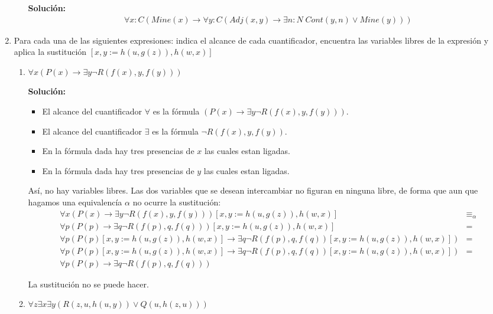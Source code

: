 \documentclass[8pt, letterpaper]{article}
\begin{document}
\begin{enumerate}
\begin{enumerate}
  \hfill\break
  \ttfamily
  {\bf Solución:}
  \begin{align*}
    \forall x:C(Mine(x) \rightarrow \forall y:C(Adj(x,y)\rightarrow \exists n:N\;Cont(y, n)\lor Mine(y)))
  \end{align*}
  \rmfamily
\end{enumerate}
\newpage
\item Para cada una de las siguientes expresiones: indica el alcance de cada cuantificador, encuentra las variables libres de la expresión y aplica la sustitución $[x,y:=h(u,g(z)),h(w,x)]$
\begin{enumerate}
\item $\forall x (P(x) \rightarrow \exists y \neg R(f(x),y,f(y)))$
  
  \hfill\break
  \ttfamily
  {\bf Solución:}

  \begin{itemize}
  \item El alcance del cuantificador $\forall$ es la fórmula $(P(x) \rightarrow \exists y \neg R(f(x),y,f(y)))$.
  \item El alcance del cuantificador $\exists$ es la fórmula $\neg R(f(x),y,f(y))$.
  \item En la fórmula dada hay tres presencias de $x$ las cuales estan ligadas.
  \item En la fórmula dada hay tres presencias de $y$ las cuales estan ligadas.
  \end{itemize}
  Así, no hay variables libres. Las dos variables que se desean
  intercambiar no figuran en ninguna libre, de forma que aun que hagamos
  una equivalencía $\alpha$ no ocurre la sustitución:
  \begin{align*}
    \forall x (P(x) \rightarrow \exists y \neg R(f(x),y,f(y)))[x,y:=h(u,g(z)),h(w,x)]&\equiv_\alpha \\
    \forall p (P(p) \rightarrow \exists q \neg R(f(p),q,f(q)))[x,y:=h(u,g(z)),h(w,x)]&=\\
    \forall p (P(p)[x,y:=h(u,g(z)),h(w,x)] \rightarrow
    \exists q \neg R(f(p),q,f(q))[x,y:=h(u,g(z)),h(w,x)]) &= \\
    \forall p (P(p)[x,y:=h(u,g(z)),h(w,x)] \rightarrow
    \exists q \neg R(f(p),q,f(q))[x,y:=h(u,g(z)),h(w,x)]) &= \\
    \forall p (P(p) \rightarrow\exists q \neg R(f(p),q,f(q))) 
  \end{align*}

  La sustitución no se puede hacer.
  \rmfamily
\item $\forall z \exists x \exists y(R(z,u,h(u,y)) \vee Q(u,h(z,u)))$
  

\end{enumerate}
\end{enumerate}
\end{document}

